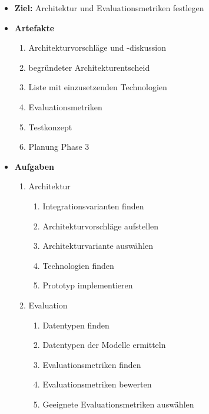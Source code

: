 \begin{itemize}
    \item \textbf{Ziel:} Architektur und Evaluationsmetriken festlegen
    \item \textbf{Artefakte}
        \begin{enumerate}
            \item Architekturvorschläge und -diskussion
            \item begründeter Architekturentscheid
            \item Liste mit einzusetzenden Technologien
            \item Evaluationsmetriken
            \item Testkonzept
            \item Planung Phase 3
        \end{enumerate}
    \item \textbf{Aufgaben}
        \begin{enumerate}
            \item Architektur
                \begin{multicols}{2}
                    \begin{enumerate}
                        \item Integrationsvarianten finden
                        \item Architekturvorschläge aufstellen
                        \item Architekturvariante auswählen
                        \item Technologien finden
                        \item Prototyp implementieren
                    \end{enumerate}
                \end{multicols}
            \item Evaluation
                \begin{multicols}{2}
                    \begin{enumerate}
                        \item Datentypen finden
                        \item Datentypen der Modelle ermitteln
                        \item Evaluationsmetriken finden
                        \item Evaluationsmetriken bewerten
                        \item Geeignete Evaluationsmetriken auswählen
                    \end{enumerate}

\end{multicols}
\end{enumerate}
\end{itemize}
